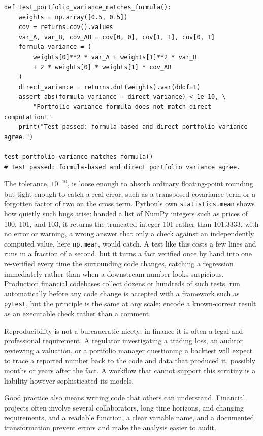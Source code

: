 \documentclass[../ai_in_finance]{subfiles}
\begin{document}
\begin{verbatim}
def test_portfolio_variance_matches_formula():
    weights = np.array([0.5, 0.5])
    cov = returns.cov().values
    var_A, var_B, cov_AB = cov[0, 0], cov[1, 1], cov[0, 1]
    formula_variance = (
        weights[0]**2 * var_A + weights[1]**2 * var_B
        + 2 * weights[0] * weights[1] * cov_AB
    )
    direct_variance = returns.dot(weights).var(ddof=1)
    assert abs(formula_variance - direct_variance) < 1e-10, \
        "Portfolio variance formula does not match direct computation!"
    print("Test passed: formula-based and direct portfolio variance agree.")

test_portfolio_variance_matches_formula()
# Test passed: formula-based and direct portfolio variance agree.
\end{verbatim}

The tolerance, $10^{-10}$, is loose enough to absorb ordinary floating-point rounding but tight enough to catch a real error, such as a transposed covariance term or a forgotten factor of two on the cross term. Python's own \texttt{statistics.mean} shows how quietly such bugs arise: handed a list of NumPy integers such as prices of 100, 101, and 103, it returns the truncated integer 101 rather than 101.3333, with no error or warning, a wrong answer that only a check against an independently computed value, here \texttt{np.mean}, would catch.
A test like this costs a few lines and runs in a fraction of a second, but it turns a fact verified once by hand into one re-verified every time the surrounding code changes, catching a regression immediately rather than when a downstream number looks suspicious.
Production financial codebases collect dozens or hundreds of such tests, run automatically before any code change is accepted with a framework such as \texttt{pytest}, but the principle is the same at any scale: encode a known-correct result as an executable check rather than a comment.

Reproducibility is not a bureaucratic nicety; in finance it is often a legal and professional requirement. A regulator investigating a trading loss, an auditor reviewing a valuation, or a portfolio manager questioning a backtest will expect to trace a reported number back to the code and data that produced it, possibly months or years after the fact. A workflow that cannot support this scrutiny is a liability however sophisticated its models.

Good practice also means writing code that others can understand. Financial projects often involve several collaborators, long time horizons, and changing requirements, and a readable function, a clear variable name, and a documented transformation prevent errors and make the analysis easier to audit.
\end{document}
